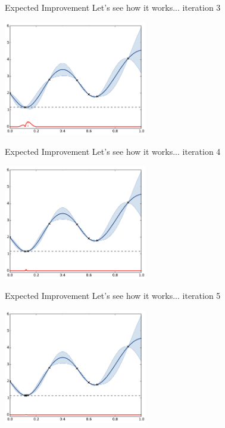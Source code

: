 \documentclass{beamer}
\begin{document}
\begin{frame}[noframenumbering]{Expected Improvement}
Let's see how it works... iteration 3
\begin{center}
\includegraphics[height=5cm]{figures/python/ego_EI3}
\end{center}
\end{frame}

\begin{frame}[noframenumbering]{Expected Improvement}
Let's see how it works... iteration 4
\begin{center}
\includegraphics[height=5cm]{figures/python/ego_EI4}
\end{center}
\end{frame}

\begin{frame}[noframenumbering]{Expected Improvement}
Let's see how it works... iteration 5
\begin{center}
\includegraphics[height=5cm]{figures/python/ego_EI9}
\end{center}
\end{frame}
\end{document}
